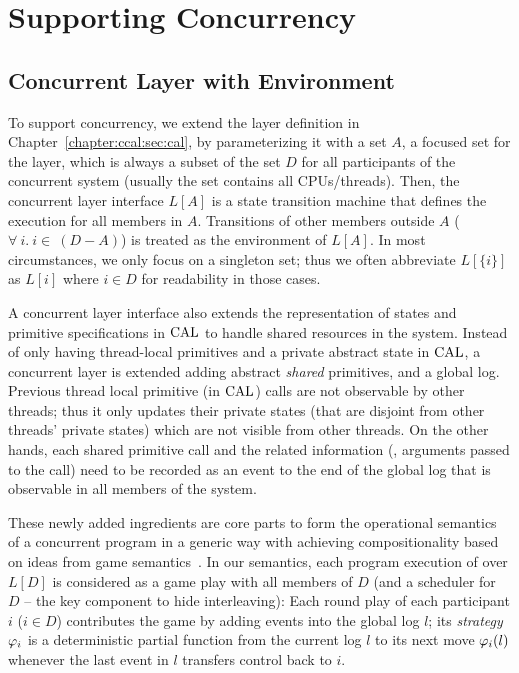 \section{Supporting Concurrency}
\label{chapter:ccal:sec:ccal-overview}

\subsection{Concurrent Layer with Environment}
\label{chapter:ccal:subsec:concurrent-layer-with-environment}

To support concurrency, 
we extend the layer definition in Chapter~\ref{chapter:ccal:sec:cal},
by parameterizing it with a set $A$, 
a focused set for the layer, which is always a subset of the set $D$ for all participants of the concurrent system (usually the set contains all CPUs/threads).
Then, the concurrent layer interface $L[A]$ is a state transition machine
that defines the execution for all members in $A$. 
Transitions of other members outside $A$  ($\forall \ i . \ i \in\ (D - A)$)
is treated as the environment of $L[A]$. 
In most circumstances, we only focus on a singleton set; 
thus we often abbreviate $L[\{i\}]$ as $L[i]$ where $i\in{}D$ for readability in those cases.

A concurrent layer interface also extends the representation of states and primitive specifications in $\mathrm{CAL}$ to handle shared resources in the system. 
Instead of only having thread-local primitives and a private abstract state in $\mathrm{CAL}$, 
a concurrent layer is extended adding abstract \textit{shared} primitives, 
and a global log. 
Previous thread local primitive (in $\mathrm{CAL}$) calls are not observable by other threads; thus it only updates their private states (that are disjoint from other threads' private states) which are not visible from other threads. 
On the other hands, each shared primitive call and the related information (\ie, arguments passed to the call) 
need to be recorded as an event to the end of the global log that
is observable in all members of the system.

These newly added ingredients are core parts to form the operational semantics of a concurrent program 
 in a generic way with achieving  compositionality based on
ideas from game semantics~\cite{gsinvite}. 
In our semantics, 
each program execution of  over 
$L[D]$ is considered as a game play with all members of $D$ 
(and a scheduler for $D$ -- the key component to hide interleaving):
Each round play of each participant $i$ ($i\in{}D$) contributes the game 
by adding events into the global log $l$; its {\em strategy}
$\varphi_{i}$ is a deterministic partial function from
the current log $l$ to its next move $\varphi_{i}(l)$ whenever
the last event in $l$ transfers control back to $i$. 

